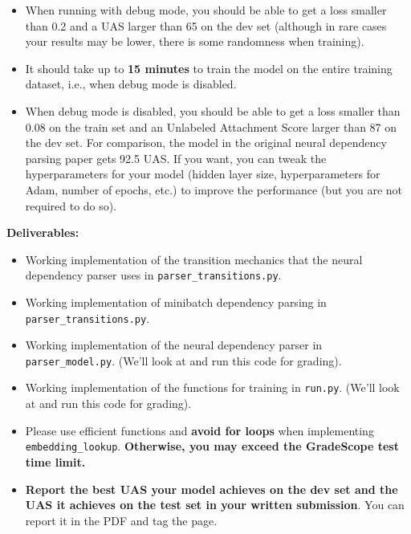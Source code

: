 \begin{parts}
\begin{enumerate}[label=\roman*.]
\begin{itemize}
        \item
            When running with debug mode, you should be able to get a loss smaller than 0.2 and a UAS larger than 65 on the dev set (although in rare cases your results may be lower, there is some randomness when training).
        
        \item It should take up to \textbf{15 minutes} to train the model on the entire training dataset, i.e., when debug mode is disabled.
        
        \item When debug mode is disabled, you should be able to get a loss smaller than 0.08 on the train set and an Unlabeled Attachment Score larger than 87 on the dev set. For comparison, the model in the original neural dependency parsing paper gets 92.5 UAS. If you want, you can tweak the hyperparameters for your model (hidden layer size, hyperparameters for Adam, number of epochs, etc.) to improve the performance (but you are not required to do so).
    \end{itemize}
    
    \textbf{Deliverables:}
        \begin{itemize}
            \item Working implementation of the transition mechanics that the neural dependency parser uses in \texttt{parser\_transitions.py}. 
            \item Working implementation of minibatch dependency parsing in \texttt{parser\_transitions.py}.
            \item Working implementation of the neural dependency parser in \texttt{parser\_model.py}. (We'll look at and run this code for grading).
            \item Working implementation of the functions for training in \texttt{run.py}. (We'll look at and run this code for grading).
            \item Please use efficient functions and \textbf{avoid for loops} when implementing \texttt{embedding\_lookup}. \textbf{Otherwise, you may exceed the GradeScope test time limit.}
            \item \textbf{Report the best UAS your model achieves on the dev set and the UAS it achieves on the test set in your written submission}. You can report it in the PDF and tag the page.
    \end{itemize}
    \end{enumerate}
    
\end{parts}
